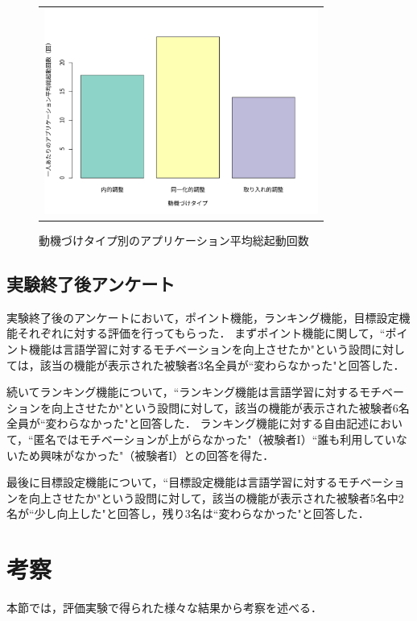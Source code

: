 \begin{figure}[htb]
\begin{center}
\begin{tabular}{c}
\begin{minipage}[htb]{\linewidth}
  \begin{center}
  \includegraphics[width=9cm]{images/7/motivation_type_app_open.pdf}
  \caption{動機づけタイプ別のアプリケーション平均総起動回数}
  \label{fig:motivation_type_app_open}
  \end{center}
\end{minipage}

\end{tabular}
\end{center}
\end{figure}


\subsection{実験終了後アンケート}
実験終了後のアンケートにおいて，ポイント機能，ランキング機能，目標設定機能それぞれに対する評価を行ってもらった．
まずポイント機能に関して，``ポイント機能は言語学習に対するモチベーションを向上させたか"という設問に対しては，該当の機能が表示された被験者3名全員が``変わらなかった"と回答した．

続いてランキング機能について，``ランキング機能は言語学習に対するモチベーションを向上させたか"という設問に対して，該当の機能が表示された被験者6名全員が``変わらなかった"と回答した．
ランキング機能に対する自由記述において，``匿名ではモチベーションが上がらなかった"（被験者I）``誰も利用していないため興味がなかった"（被験者I）との回答を得た．

最後に目標設定機能について，``目標設定機能は言語学習に対するモチベーションを向上させたか"という設問に対して，該当の機能が表示された被験者5名中2名が``少し向上した"と回答し，残り3名は``変わらなかった"と回答した．

\section{考察}
本節では，評価実験で得られた様々な結果から考察を述べる．

